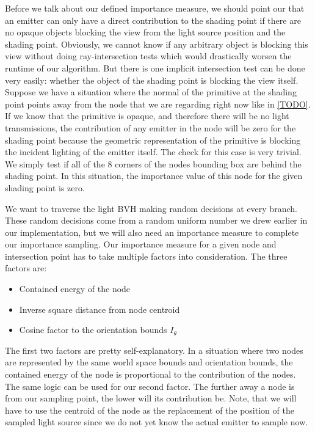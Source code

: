 Before we talk about our defined importance measure, we should point our that an emitter can only have a direct contribution to the shading point if there are no opaque objects blocking the view from the light source position and the shading point. Obviously, we cannot know if any arbitrary object is blocking this view without doing ray-intersection tests which would drastically worsen the runtime of our algorithm. But there is one implicit intersection test can be done very easily: whether the object of the shading point is blocking the view itself. Suppose we have a situation where the normal of the primitive at the shading point points away from the node that we are regarding right now like in \ref{TODO}. If we know that the primitive is opaque, and therefore there will be no light transmissions, the contribution of any emitter in the node will be zero for the shading point because the geometric representation of the primitive is blocking the incident lighting of the emitter itself. The check for this case is very trivial. We simply test if all of the 8 corners of the nodes bounding box are behind the shading point. In this situation, the importance value of this node for the given shading point is zero.

We want to traverse the light BVH making random decisions at every branch. These random decisions come from a random uniform number we drew earlier in our implementation, but we will also need an importance measure to complete our importance sampling. Our importance measure for a given node and intersection point has to take multiple factors into consideration. The three factors are:

\begin{itemize}
	\item Contained energy of the node
	\item Inverse square distance from node centroid
	\item Cosine factor to the orientation bounds $I_\theta$
\end{itemize}

The first two factors are pretty self-explanatory. In a situation where two nodes are represented by the same world space bounds and orientation bounds, the contained energy of the node is proportional to the contribution of the nodes. The same logic can be used for our second factor. The further away a node is from our sampling point, the lower will its contribution be. Note, that we will have to use the centroid of the node as the replacement of the position of the sampled light source since we do not yet know the actual emitter to sample now.

